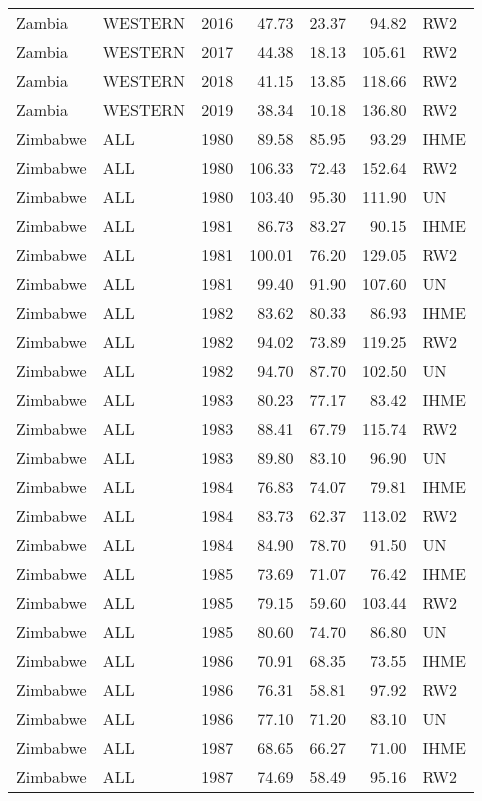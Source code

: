 \begin{longtable}{lllrrrl}
  Zambia & WESTERN & 2016 & 47.73 & 23.37 & 94.82 & RW2 \\ 
  Zambia & WESTERN & 2017 & 44.38 & 18.13 & 105.61 & RW2 \\ 
  Zambia & WESTERN & 2018 & 41.15 & 13.85 & 118.66 & RW2 \\ 
  Zambia & WESTERN & 2019 & 38.34 & 10.18 & 136.80 & RW2 \\ 
  Zimbabwe & ALL & 1980 & 89.58 & 85.95 & 93.29 & IHME \\ 
  Zimbabwe & ALL & 1980 & 106.33 & 72.43 & 152.64 & RW2 \\ 
  Zimbabwe & ALL & 1980 & 103.40 & 95.30 & 111.90 & UN \\ 
  Zimbabwe & ALL & 1981 & 86.73 & 83.27 & 90.15 & IHME \\ 
  Zimbabwe & ALL & 1981 & 100.01 & 76.20 & 129.05 & RW2 \\ 
  Zimbabwe & ALL & 1981 & 99.40 & 91.90 & 107.60 & UN \\ 
  Zimbabwe & ALL & 1982 & 83.62 & 80.33 & 86.93 & IHME \\ 
  Zimbabwe & ALL & 1982 & 94.02 & 73.89 & 119.25 & RW2 \\ 
  Zimbabwe & ALL & 1982 & 94.70 & 87.70 & 102.50 & UN \\ 
  Zimbabwe & ALL & 1983 & 80.23 & 77.17 & 83.42 & IHME \\ 
  Zimbabwe & ALL & 1983 & 88.41 & 67.79 & 115.74 & RW2 \\ 
  Zimbabwe & ALL & 1983 & 89.80 & 83.10 & 96.90 & UN \\ 
  Zimbabwe & ALL & 1984 & 76.83 & 74.07 & 79.81 & IHME \\ 
  Zimbabwe & ALL & 1984 & 83.73 & 62.37 & 113.02 & RW2 \\ 
  Zimbabwe & ALL & 1984 & 84.90 & 78.70 & 91.50 & UN \\ 
  Zimbabwe & ALL & 1985 & 73.69 & 71.07 & 76.42 & IHME \\ 
  Zimbabwe & ALL & 1985 & 79.15 & 59.60 & 103.44 & RW2 \\ 
  Zimbabwe & ALL & 1985 & 80.60 & 74.70 & 86.80 & UN \\ 
  Zimbabwe & ALL & 1986 & 70.91 & 68.35 & 73.55 & IHME \\ 
  Zimbabwe & ALL & 1986 & 76.31 & 58.81 & 97.92 & RW2 \\ 
  Zimbabwe & ALL & 1986 & 77.10 & 71.20 & 83.10 & UN \\ 
  Zimbabwe & ALL & 1987 & 68.65 & 66.27 & 71.00 & IHME \\ 
  Zimbabwe & ALL & 1987 & 74.69 & 58.49 & 95.16 & RW2 \\ 

\end{longtable}
